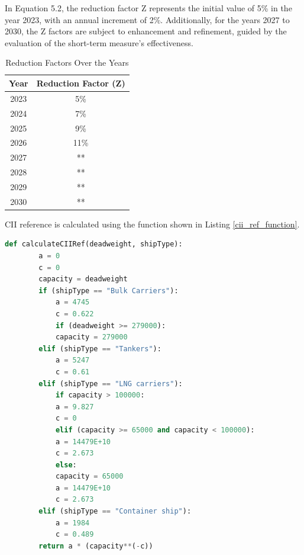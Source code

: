 In Equation 5.2, the reduction factor Z represents the initial value of 5\% in the year 2023,
with an annual increment of 2\%. Additionally, for the years 2027 to 2030,
the Z factors are subject to enhancement and refinement, guided by the evaluation of the short-term measure's effectiveness.

\newpage

\begin{table}[htbp]
    \centering
    \begin{tabular}{cc}
        \toprule
        Year & Reduction Factor (Z) \\
        \midrule
        2023 & 5\%                  \\
        2024 & 7\%                  \\
        2025 & 9\%                  \\
        2026 & 11\%                 \\
        2027 & **                   \\
        2028 & **                   \\
        2029 & **                   \\
        2030 & **                   \\
        \bottomrule
    \end{tabular}
    \caption{Reduction Factors Over the Years}
    \label{tab:reduction-factors}
\end{table}

CII reference is calculated using the function shown in Listing \ref{cii_ref_function}.

\begin{lstlisting}[language=python, caption=Function to calculate CII reference, label=cii_ref_function]
    def calculateCIIRef(deadweight, shipType):
        a = 0
        c = 0
        capacity = deadweight
        if (shipType == "Bulk Carriers"):
            a = 4745
            c = 0.622
            if (deadweight >= 279000):
            capacity = 279000
        elif (shipType == "Tankers"):
            a = 5247
            c = 0.61
        elif (shipType == "LNG carriers"):
            if capacity > 100000:
            a = 9.827
            c = 0
            elif (capacity >= 65000 and capacity < 100000):
            a = 14479E+10
            c = 2.673
            else:
            capacity = 65000
            a = 14479E+10
            c = 2.673
        elif (shipType == "Container ship"):
            a = 1984
            c = 0.489
        return a * (capacity**(-c))
\end{lstlisting}


